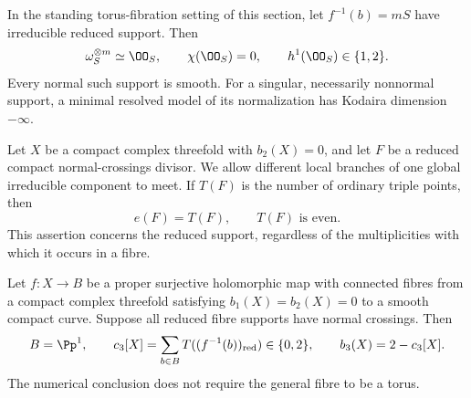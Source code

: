 
\begin{proposition}[P4.12]\hypertarget{tag-02WJ}{}\label{night:P4.12}\label{stmt:P4.12}


In the standing torus-fibration setting of this section, let $f^{-1}(b)=mS$
have irreducible reduced support. Then
\[
 \omega_S^{\otimes m}\simeq\OO_S,\qquad
 \chi(\OO_S)=0,\qquad h^1(\OO_S)\in\{1,2\}.
\]
Every normal such support is smooth. For a singular, necessarily
nonnormal support, a minimal resolved model of its normalization
has Kodaira dimension $-\infty$.
\end{proposition}

\begin{proposition}[P4.6]\hypertarget{tag-02XY}{}\label{night:P4.6}\label{stmt:P4.6}


Let $X$ be a compact complex threefold with $b_2(X)=0$, and let $F$ be a
reduced compact normal-crossings divisor. We allow different local
branches of one global irreducible component to meet. If $T(F)$ is the
number of ordinary triple points, then
\[
 e(F)=T(F),\qquad T(F)\text{ is even}.
\]
This assertion concerns the reduced support, regardless of the
multiplicities with which it occurs in a fibre.
\end{proposition}

\begin{proposition}[P4.7]\hypertarget{tag-02XZ}{}\label{night:P4.7}\label{stmt:P4.7}


Let $f:X\to B$ be a proper surjective holomorphic map with connected
fibres from a compact complex threefold satisfying $b_1(X)=b_2(X)=0$
to a smooth compact curve. Suppose all reduced fibre supports have
normal crossings. Then
\[
 B=\Pp^1,\qquad
 c_3[X]=\sum_{b\in B}T((f^{-1}(b))_{\mathrm{red}})\in\{0,2\},\qquad
 b_3(X)=2-c_3[X].
\]
The numerical conclusion does not require the general fibre to be a
torus.
\end{proposition}


